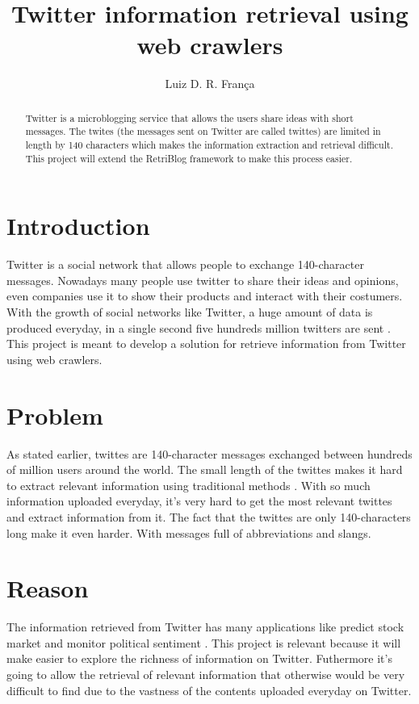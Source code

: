 \documentclass[12pt]{article}
\title{Twitter information retrieval using web crawlers}
\author{Luiz D. R. Fran\c{c}a\inst{1}}
\begin{document}
 

\maketitle

\begin{abstract} 
Twitter is a microblogging service that allows the users share ideas with short messages. The twites (the messages sent on Twitter are called twittes) are limited in length by 140 characters which makes the information extraction and retrieval difficult. This project will extend the RetriBlog framework \cite{Ferreira:13} to make this process easier. 
\end{abstract}

\section{Introduction}

Twitter is a social network that allows people to exchange 140-character messages. Nowadays many people use twitter to share their ideas and opinions, even companies use it to show their products and interact with their costumers. With the growth of social networks like Twitter, a huge amount of data is produced everyday, in a single second five hundreds million twitters are sent \cite{NetLiveStats}. This project is meant to develop a solution for retrieve information from Twitter using web crawlers.

\section{Problem}
As stated earlier, twittes are 140-character messages exchanged between hundreds of million users around the world. The small length of the twittes makes it hard to extract relevant information using traditional methods \cite{Sriram:10}.  With so much information uploaded everyday, it's very hard to get the most relevant twittes and extract information from it. The fact that the twittes  are only 140-characters long make it even harder. With messages full of abbreviations and slangs.

\section{Reason}
The information retrieved from Twitter has many applications like predict stock market \cite{Bollen:11} and monitor political sentiment \cite{Bermingham:11}.
This project is relevant because it will make easier to explore the richness of information on Twitter. Futhermore it's going to allow the retrieval of relevant information that otherwise would be very difficult to find due to the vastness of the contents uploaded everyday on Twitter. 
\end{document}

